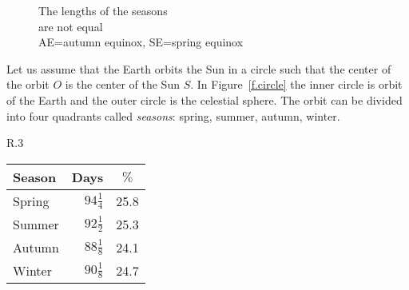 \begin{figure}[b]
\begin{minipage}{.48\textwidth}
\begin{center}
\caption{The lengths of the seasons\\are not equal\\%
\textsf{\small AE=autumn equinox}, \textsf{\small SE=spring equinox}}\label{f.seasons}
\end{center}
\end{minipage}
\end{figure}

Let us assume that the Earth orbits the Sun in a circle such that the center of the orbit $O$ is the center of the Sun $S$. In Figure~\ref{f.circle} the inner circle is orbit of the Earth and the outer circle is the celestial sphere. The orbit can be divided into four quadrants called \emph{seasons}: spring, summer, autumn, winter.

\begin{wrapfigure}{R}{.3\textwidth}
\begin{sffamily}
\renewcommand{\arraystretch}{1.3}
\vspace*{-2ex}
\begin{tabular}{|l|r|r|}
\hline
Season & \multicolumn{1}{|c|}{Days}&\multicolumn{1}{|c|}{$\%$}\\\hline\hline
Spring & $94\frac{1}{4}$ & 25.8\\\hline
Summer & $92\frac{1}{2}$ & 25.3\\\hline
Autumn & $88\frac{1}{8}$ & 24.1\\\hline
Winter & $90\frac{1}{8}$ & 24.7\\\hline
\end{tabular}
\end{sffamily}
\end{wrapfigure}

